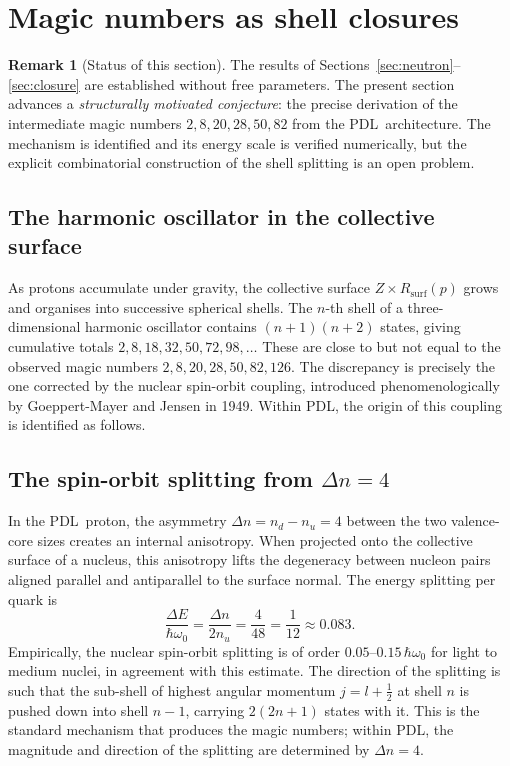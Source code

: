\documentclass[11pt,a4paper]{article}
\theoremstyle{definition}
\newtheorem{remark}[theorem]{Remark}
\newcommand{\PDL}{\textnormal{PDL}}
\newcommand{\Rsurf}{R_{\mathrm{surf}}}
\begin{document}
\section{Magic numbers as shell closures}
\label{sec:magic}

\begin{remark}[Status of this section]
\label{rem:conjecture}
The results of Sections~\ref{sec:neutron}--\ref{sec:closure} are established without free parameters. The present section advances a \emph{structurally motivated conjecture}: the precise derivation of the intermediate magic numbers $2, 8, 20, 28, 50, 82$ from the \PDL\ architecture. The mechanism is identified and its energy scale is verified numerically, but the explicit combinatorial construction of the shell splitting is an open problem.
\end{remark}

\subsection{The harmonic oscillator in the collective surface}
\label{subsec:HO}

As protons accumulate under gravity, the collective surface $Z \times \Rsurf(p)$ grows and organises into successive spherical shells. The $n$-th shell of a three-dimensional harmonic oscillator contains $(n+1)(n+2)$ states, giving cumulative totals $2, 8, 18, 32, 50, 72, 98, \ldots$ These are close to but not equal to the observed magic numbers $2, 8, 20, 28, 50, 82, 126$. The discrepancy is precisely the one corrected by the nuclear spin-orbit coupling, introduced phenomenologically by Goeppert-Mayer and Jensen in 1949.\cite{GoeppertMayer_1949,Jensen_1949} Within \PDL, the origin of this coupling is identified as follows.

\subsection{The spin-orbit splitting from \texorpdfstring{$\Delta n = 4$}{Delta\_n = 4}}
\label{subsec:spinorbit}

In the \PDL\ proton, the asymmetry $\Delta n = n_d - n_u = 4$ between the two valence-core sizes creates an internal anisotropy. When projected onto the collective surface of a nucleus, this anisotropy lifts the degeneracy between nucleon pairs aligned parallel and antiparallel to the surface normal. The energy splitting per quark is
\[
\frac{\Delta E}{\hbar\omega_0} = \frac{\Delta n}{2n_u} = \frac{4}{48} = \frac{1}{12} \approx 0.083.
\]
Empirically, the nuclear spin-orbit splitting is of order $0.05$--$0.15\,\hbar\omega_0$ for light to medium nuclei, in agreement with this estimate. The direction of the splitting is such that the sub-shell of highest angular momentum $j = l + \tfrac{1}{2}$ at shell $n$ is pushed down into shell $n-1$, carrying $2(2n+1)$ states with it. This is the standard mechanism that produces the magic numbers; within \PDL, the magnitude and direction of the splitting are determined by $\Delta n = 4$.
\end{document}
